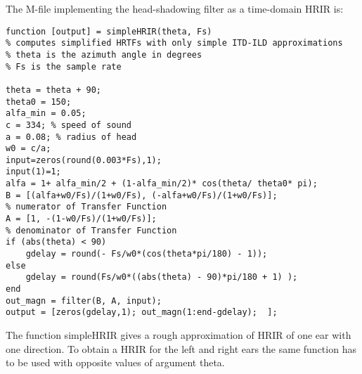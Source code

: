 \documentclass[10pt,a4paper,oneside]{article}
\begin{document}
The M-file implementing the head-shadowing filter as a time-domain HRIR is:
\begin{lstlisting}
function [output] = simpleHRIR(theta, Fs)
% computes simplified HRTFs with only simple ITD-ILD approximations
% theta is the azimuth angle in degrees
% Fs is the sample rate

theta = theta + 90;
theta0 = 150;															
alfa_min = 0.05;		
c = 334; % speed of sound
a = 0.08; % radius of head												
w0 = c/a;
input=zeros(round(0.003*Fs),1); 
input(1)=1;
alfa = 1+ alfa_min/2 + (1-alfa_min/2)* cos(theta/ theta0* pi);	
B = [(alfa+w0/Fs)/(1+w0/Fs), (-alfa+w0/Fs)/(1+w0/Fs)];	
% numerator of Transfer Function
A = [1, -(1-w0/Fs)/(1+w0/Fs)];	                      
% denominator of Transfer Function
if (abs(theta) < 90)
	gdelay = round(- Fs/w0*(cos(theta*pi/180) - 1));
else
	gdelay = round(Fs/w0*((abs(theta) - 90)*pi/180 + 1) );
end
out_magn = filter(B, A, input);
output = [zeros(gdelay,1); out_magn(1:end-gdelay);  ];

\end{lstlisting}

The function simpleHRIR gives a rough approximation of HRIR of one ear with one direction. To obtain a HRIR for the left and right ears the same function has to be used with opposite values of argument theta.
\end{document}
